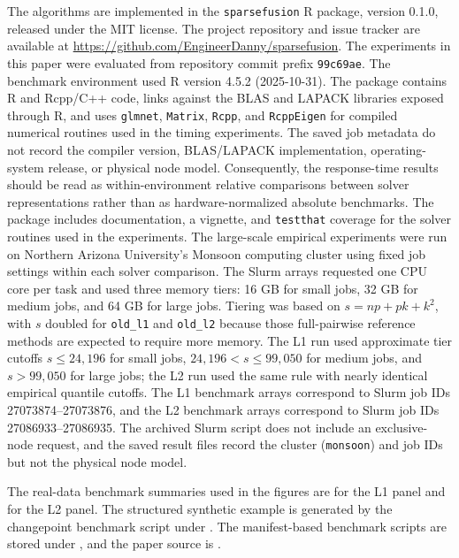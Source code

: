 \documentclass[twoside,11pt]{article}
\newcommand{\sparsefusion}{\texttt{sparsefusion}\xspace}
\begin{document}
The algorithms are implemented in the \sparsefusion R package, version 0.1.0,
released under the MIT license. The project repository and issue tracker are
available at \url{https://github.com/EngineerDanny/sparsefusion}. The experiments
in this paper were evaluated from repository commit prefix
\texttt{99c69ae}. The benchmark environment used R version 4.5.2
(2025-10-31). The package contains R and Rcpp/C++ code, links against the
BLAS and LAPACK libraries exposed through R, and uses \texttt{glmnet},
\texttt{Matrix}, \texttt{Rcpp}, and \texttt{RcppEigen} for compiled numerical
routines used in the timing experiments. The saved job metadata do not record
the compiler version, BLAS/LAPACK implementation, operating-system release, or
physical node model. Consequently, the response-time results should be read as
within-environment relative comparisons between solver representations rather
than as hardware-normalized absolute benchmarks. The package includes
documentation, a vignette, and \texttt{testthat} coverage for the solver
routines used in the experiments.
The large-scale empirical experiments were run on Northern Arizona
University's Monsoon computing cluster \citep{nau_monsoon} using fixed job
settings within each solver comparison. The Slurm arrays requested one CPU
core per task and used three memory tiers: 16 GB for small jobs, 32 GB for
medium jobs, and 64 GB for large jobs. Tiering was based on
$s=np+pk+k^2$, with $s$ doubled for \texttt{old\_l1} and \texttt{old\_l2}
because those full-pairwise reference methods are expected to require more
memory. The L1 run used approximate tier cutoffs
$s\leq 24{,}196$ for small jobs, $24{,}196<s\leq 99{,}050$ for medium jobs,
and $s>99{,}050$ for large jobs; the L2 run used the same rule with nearly
identical empirical quantile cutoffs. The L1 benchmark arrays correspond to
Slurm job IDs 27073874--27073876, and the L2 benchmark arrays correspond to
Slurm job IDs 27086933--27086935. The archived Slurm script does not include
an exclusive-node request, and the saved result files record the cluster
(\texttt{monsoon}) and job IDs but not the physical node model.

The real-data benchmark summaries used in the figures are
 for the L1 panel and
 for the L2 panel. The
structured synthetic example is generated by the changepoint benchmark script
under . The manifest-based
benchmark scripts are stored under , and the paper source is
.
\end{document}
